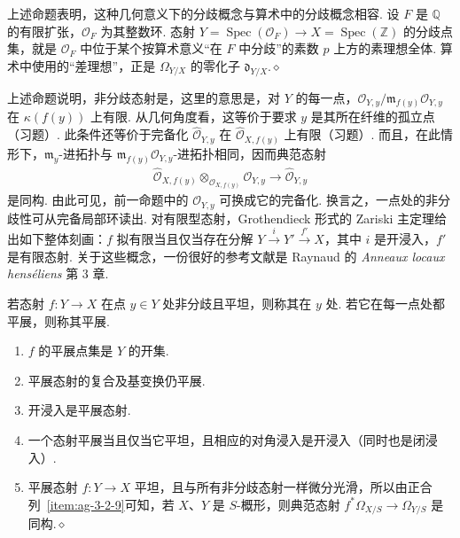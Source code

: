 \begin{remark}\label{item:ag-3-3-5}
上述命题表明，这种几何意义下的分歧概念与算术中的分歧概念相容. 设 $F$ 是 $\mathbb Q$ 的有限扩张，$\mathcal O_F$ 为其整数环. 态射 $Y=\operatorname{Spec}(\mathcal O_F)\longrightarrow X=\operatorname{Spec}(\mathbb Z)$ 的分歧点集，就是 $\mathcal O_F$ 中位于某个按算术意义``在 $F$ 中分歧''的素数 $p$ 上方的素理想全体. 算术中使用的``差理想''，正是 $\Omega_{Y/X}$ 的零化子 $\mathfrak d_{Y/X}$.\unskip\nobreak\hfill\ensuremath{\diamond}
\renewcommand{\envenddiamond}{}
\end{remark}
\begin{numpara}[拟有限态射]\label{item:ag-3-3-6}
上述命题说明，非分歧态射是，这里的意思是，对 $Y$ 的每一点，$\mathcal O_{Y,y}/\mathfrak m_{f(y)}\mathcal O_{Y,y}$ 在 $\kappa(f(y))$ 上有限. 从几何角度看，这等价于要求 $y$ 是其所在纤维的孤立点（习题）. 此条件还等价于完备化 $\widehat{\mathcal O}_{Y,y}$ 在 $\widehat{\mathcal O}_{X,f(y)}$ 上有限（习题）. 而且，在此情形下，$\mathfrak m_y$-进拓扑与 $\mathfrak m_{f(y)}\mathcal O_{Y,y}$-进拓扑相同，因而典范态射
\begin{align*}
\widehat{\mathcal O}_{X,f(y)}\otimes_{\mathcal O_{X,f(y)}}\mathcal O_{Y,y}\longrightarrow\widehat{\mathcal O}_{Y,y}
\end{align*}
是同构. 由此可见，前一命题中的 $\mathcal O_{Y,y}$ 可换成它的完备化. 换言之，一点处的非分歧性可从完备局部环读出.
对有限型态射，Grothendieck 形式的 Zariski 主定理给出如下整体刻画：$f$ 拟有限当且仅当存在分解 $Y\xrightarrow iY'\xrightarrow{f'}X$，其中 $i$ 是开浸入，$f'$ 是有限态射. 关于这些概念，一份很好的参考文献是 Raynaud 的 \emph{Anneaux locaux henséliens} 第 3 章.
\end{numpara}
\begin{definition}\label{item:ag-3-3-7}
若态射 $f:Y\longrightarrow X$ 在点 $y\in Y$ 处非分歧且平坦，则称其在 $y$ 处. 若它在每一点处都平展，则称其平展.
\end{definition}
\begin{remark}\label{item:ag-3-3-8}
\begin{enumerate}[label=(\roman*)]
\item $f$ 的平展点集是 $Y$ 的开集.
\item 平展态射的复合及基变换仍平展.
\item 开浸入是平展态射.
\item 一个态射平展当且仅当它平坦，且相应的对角浸入是开浸入（同时也是闭浸入）.
\item 平展态射 $f:Y\longrightarrow X$ 平坦，且与所有非分歧态射一样微分光滑，所以由正合列~\ref{item:ag-3-2-9}可知，若 $X$、$Y$ 是 $S$-概形，则典范态射 $f^*\Omega_{X/S}\longrightarrow\Omega_{Y/S}$ 是同构.\unskip\nobreak\hfill\ensuremath{\diamond}
\end{enumerate}
\renewcommand{\envenddiamond}{}
\end{remark}

